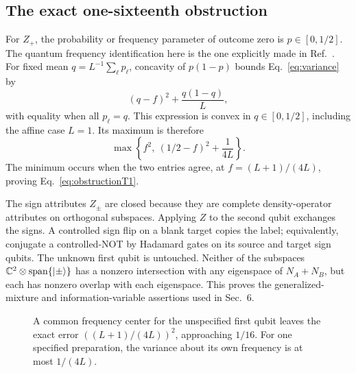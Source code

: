 \subsection{The exact one-sixteenth obstruction}
For $Z_+$, the probability or frequency parameter of outcome zero is $p\in[0,1/2]$. The quantum frequency identification here is the one explicitly made in Ref.~\cite[Sec.~5, E2, p.~28]{ctp}. For fixed mean $q=L^{-1}\sum_\ell p_\ell$, concavity of $p(1-p)$ bounds Eq.~\eqref{eq:variance} by
\begin{equation}\label{eq:qbound}
 (q-f)^2+\frac{q(1-q)}L,
\end{equation}
with equality when all $p_\ell=q$. This expression is convex in $q\in[0,1/2]$, including the affine case $L=1$. Its maximum is therefore
\begin{equation}\label{eq:endpointmax}
 \max\left\{f^2,\ (1/2-f)^2+\frac1{4L}\right\}.
\end{equation}
The minimum occurs when the two entries agree, at $f=(L+1)/(4L)$, proving Eq.~\eqref{eq:obstructionT1}.

The sign attributes $Z_\pm$ are closed because they are complete density-operator attributes on orthogonal subspaces. Applying $Z$ to the second qubit exchanges the signs. A controlled sign flip on a blank target copies the label; equivalently, conjugate a controlled-NOT by Hadamard gates on its source and target sign qubits. The unknown first qubit is untouched. Neither of the subspaces $\mathbb C^2\otimes\operatorname{span}\{\lvert \pm\rangle\}$ has a nonzero intersection with any eigenspace of $N_A+N_B$, but each has nonzero overlap with each eigenspace. This proves the generalized-mixture and information-variable assertions used in Sec.~6.

\begin{figure}[!htbp]
\centering
{}
\caption{A common frequency center for the unspecified first qubit leaves the exact error $((L+1)/(4L))^2$, approaching $1/16$. For one specified preparation, the variance about its own frequency is at most $1/(4L)$.}
\label{fig:frequency}
\end{figure}

